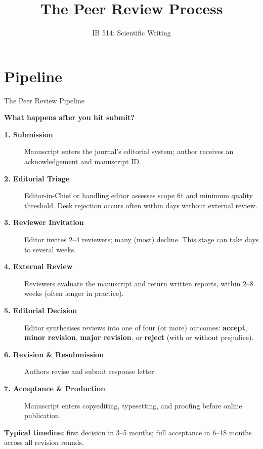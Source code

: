 \documentclass{beamer}
\title{The Peer Review Process}
\author[]{IB 514: Scientific Writing}
\date[]{}
\begin{document}
\begin{frame}
  \titlepage
\end{frame}

\section{Pipeline}
\begin{frame}{The Peer Review Pipeline}

  \footnotesize
  \textbf{What happens after you hit submit?}
  \smallskip
  \begin{description}
    \item[\textbf{1. Submission}]
      Manuscript enters the journal's editorial system;
      author receives an acknowledgement and manuscript ID.
    \item[\textbf{2. Editorial Triage}]
      Editor-in-Chief or handling editor assesses scope fit and
      minimum quality threshold. \alert{Desk rejection} occurs 
      often within days without external review.
    \item[\textbf{3. Reviewer Invitation}]
      Editor invites 2--4 reviewers; many (most) decline. This stage
      can take days to several weeks.
    \item[\textbf{4. External Review}]
      Reviewers evaluate the manuscript and return written reports,
      within 2--8 weeks (often longer in practice).
    \item[\textbf{5. Editorial Decision}]
      Editor synthesises reviews into one of four (or more) outcomes:
      \textbf{accept}, \textbf{minor revision}, \textbf{major revision},
      or \textbf{reject} (with or without prejudice).
    \item[\textbf{6. Revision \& Resubmission}]
      Authors revise and submit response letter.
    \item[\textbf{7. Acceptance \& Production}]
      Manuscript enters copyediting, typesetting, and proofing
      before online publication.
  \end{description}

  \medskip
  \textbf{Typical timeline:} first decision in 3--5 months;
  full acceptance in 6--18 months across all revision rounds.

\end{frame}


\end{document}
